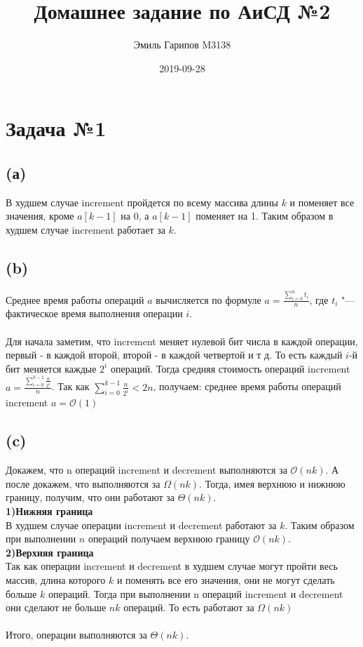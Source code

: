 \documentclass{article}
\title{Домашнее задание по АиСД №2}
\date{2019-09-28}
\author{Эмиль Гарипов M3138}
\begin{document}

\maketitle
\newpage
{}

\section*{Задача №1}
\subsection*{(а)}
В худшем случае increment пройдется по всему массива длины $k$ и поменяет все значения, кроме $a[k - 1]$ на 0, а $a[k - 1]$ поменяет на 1. Таким образом в худшем случае increment работает за $k$.
\subsection*{(b)}
Среднее время работы операций $a$ вычисляется по формуле $a = \frac{\sum\limits_{i=0}^n t_i}{n} $, где $t_i$ "--- фактическое время выполнения операции $i$.
\\\\Для начала заметим, что increment меняет нулевой бит числа в каждой операции, первый - в каждой второй, второй - в каждой четвертой и т д. То есть каждый $i$-й бит меняется каждые $2^{i}$ операций. Тогда средняя стоимость операций increment $a = \frac{\sum\limits_{i = 0}^{k - 1}\frac{n}{2^{i}}}{n}$. Так как $\sum\limits_{i = 0}^{k - 1}\frac{n}{2^{i}} < 2n$, получаем: среднее время работы операций increment $a = \mathcal{O}(1)$
\subsection*{(c)}
Докажем, что n операций increment и decrement выполняются за $\mathcal{O}(nk)$. А после докажем, что выполняются за $\Omega(nk)$. Тогда, имея верхнюю и нижнюю границу, получим, что они работают за $\Theta(nk)$.
\\
\textbf{1)Нижняя граница}
\\
В худшем случае операции increment и decrement работают за $k$. Таким образом при выполнении $n$ операций получаем верхнюю границу $\mathcal{O}(nk)$.
\\
\textbf{2)Верхняя граница}
\\
Так как операции increment и decrement в худшем случае могут пройти весь массив, длина которого $k$ и поменять все его значения, они не могут сделать больше $k$ операций. Тогда при выполнении n операций increment и decrement они сделают не больше $nk$ операций. То есть работают за $\Omega(nk)$ 
\\\\
Итого, операции  выполняются за $\Theta(nk)$.
\end{document}
